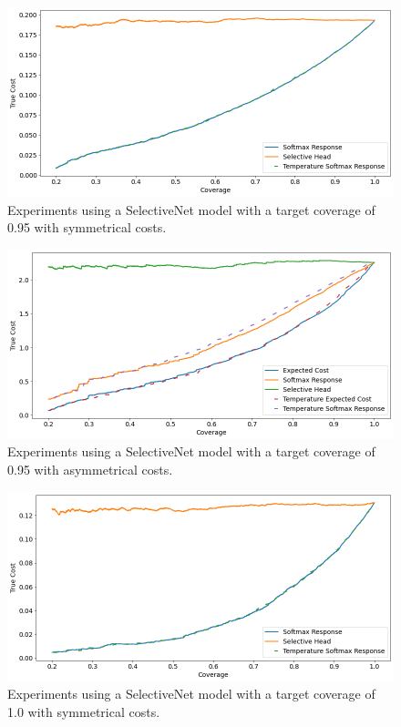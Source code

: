 \begin{figure}[h]
	\includegraphics[width=\textwidth]{images/multi-class/sn0.95-sym.png}
	\caption{Experiments using a SelectiveNet model with a target coverage of 0.95 with symmetrical costs.}
\end{figure}

\begin{figure}[h]
	\includegraphics[width=\textwidth]{images/multi-class/sn0.95-asym.png}
	\caption{Experiments using a SelectiveNet model with a target coverage of 0.95 with asymmetrical costs.}
\end{figure}

\begin{figure}[h]
	\includegraphics[width=\textwidth]{images/multi-class/sn1.0-sym.png}
	\caption{Experiments using a SelectiveNet model with a target coverage of 1.0 with symmetrical costs.}
\end{figure}

